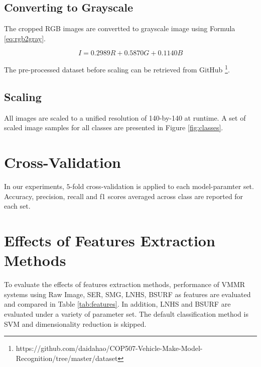 \subsection{Converting to Grayscale}
The cropped RGB images are convertted to grayscale image using Formula \ref{eq:rgb2gray}.

\begin{equation}
\label{eq:rgb2gray}
I = 0.2989 R + 0.5870 G + 0.1140 B
\end{equation}

The pre-processed dataset before scaling can be retrieved from GitHub \footnote{https://github.com/daidahao/COP507-Vehicle-Make-Model-Recognition/tree/master/dataset}.

\subsection{Scaling}
All images are scaled to a unified resolution of 140-by-140 at runtime.
A set of scaled image samples for all classes are presented in Figure \ref{fig:classes}.

\section{Cross-Validation}
In our experiments, $5$-fold cross-validation is applied to each model-paramter set.
Accuracy, precision, recall and f1 scores averaged across class are reported for each set.


\section{Effects of Features Extraction Methods}
\label{sec:effects-fe}
To evaluate the effects of features extraction methods, performance of VMMR systems using Raw Image, SER, SMG, LNHS, BSURF as features are evaluated and compared in Table \ref{tab:features}.
In addition, LNHS and BSURF are evaluated under a variety of parameter set.
The default classification method is SVM and dimensionality reduction is skipped.

